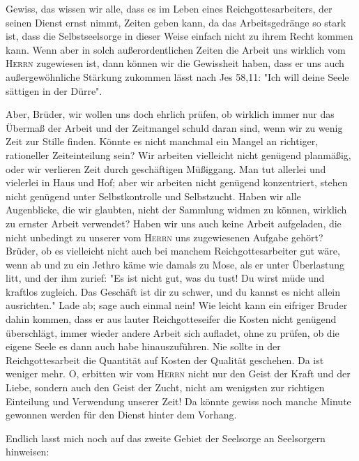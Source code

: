 \documentclass[a5paper,openany]{book}
\begin{document}
\par
Gewiss, das wissen wir alle, dass es im Leben eines Reichgottesarbeiters, der seinen Dienst ernst nimmt, Zeiten geben kann, da das Arbeitsgedränge so stark ist, dass die Selbstseelsorge in dieser Weise einfach nicht zu ihrem Recht kommen kann. Wenn aber in solch außerordentlichen Zeiten die Arbeit uns wirklich vom \textsc{Herrn} zugewiesen ist, dann können wir die Gewissheit haben, dass er uns auch außergewöhnliche Stärkung zukommen lässt nach Jes 58,11: "Ich will deine Seele sättigen in der Dürre".
\par
Aber, Brüder, wir wollen uns doch ehrlich prüfen, ob wirklich immer nur das Übermaß der Arbeit und der Zeitmangel schuld daran sind, wenn wir zu wenig Zeit zur Stille finden. Könnte es nicht manchmal ein Mangel an richtiger, rationeller Zeiteinteilung sein? Wir arbeiten vielleicht nicht genügend planmäßig, oder wir verlieren Zeit durch geschäftigen Müßiggang. Man tut allerlei und vielerlei in Haus und Hof; aber wir arbeiten nicht genügend konzentriert, stehen nicht genügend unter Selbstkontrolle und Selbstzucht. Haben wir alle Augenblicke, die wir glaubten, nicht der Sammlung widmen zu können, wirklich zu ernster Arbeit verwendet? Haben wir uns  auch keine Arbeit aufgeladen, die nicht unbedingt zu unserer vom \textsc{Herrn} uns zugewiesenen Aufgabe gehört? Brüder, ob es vielleicht nicht auch bei manchem Reichgottesarbeiter gut wäre, wenn ab und zu ein Jethro käme wie damals zu Mose, als er unter Überlastung litt, und der ihm zurief: "Es ist nicht gut, was du tust! Du wirst müde und kraftlos zugleich. Das Geschäft ist dir zu schwer, und du kannst es nicht allein ausrichten." Lade ab; sage auch einmal nein! Wie leicht kann ein eifriger Bruder dahin kommen, dass er aus lauter Reichgotteseifer die Kosten nicht genügend überschlägt, immer wieder andere Arbeit sich aufladet, ohne zu prüfen, ob die eigene Seele es dann auch habe hinauszuführen. Nie sollte in der Reichgottesarbeit die Quantität auf Kosten der Qualität geschehen. Da ist weniger mehr. O, erbitten wir vom \textsc{Herrn} nicht nur den Geist der Kraft und der Liebe, sondern auch den Geist der Zucht, nicht am wenigsten zur richtigen Einteilung und Verwendung unserer Zeit! Da könnte gewiss noch manche Minute gewonnen werden für den Dienst hinter dem Vorhang.
\par
Endlich lasst mich noch auf das zweite Gebiet der Seelsorge an Seelsorgern hinweisen:
\end{document}
